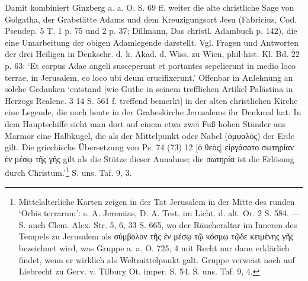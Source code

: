 \documentclass[a4paper, 11pt, oneside]{article}
\begin{document}
Damit kombiniert Ginzberg a. a. O. S. 69 ff. weiter die alte christliche Sage von Golgatha, der Grabstätte Adams und dem Kreuzigungsort Jesu (Fabricius, Cod. Pseudep. 5 T. 1 p. 75 und 2 p. 37; Dillmann, Das christl. Adambuch p. 142), die eine Umarbeitung der obigen Adamlegende darstellt. Vgl. Fragen und Antworten der drei Heiligen in Denkschr. d. k. Akad. d. Wiss. zu Wien, phil-hist. Kl. Bd. 22 p. 63: `Et corpus Adae angeli susceperunt et portantes sepelierunt in medio loco terrae, in Jerusalem, eo loco ubi deum crucifixerunt.' Offenbar in Anlehnung an solche Gedanken `entstand [wie Guthe in seinem trefflichen Artikel Palästina in Herzogs Realenc. 3 14 S. 561 f. treffend bemerkt] in der alten christlichen Kirche eine Legende, die noch heute in der Grabeskirche Jerusalems ihr Denkmal hat. In dem Hauptschiffe sieht man dort auf einem etwa zwei Fuß hohen Ständer aus Marmor eine Halbkugel, die als der Mittelpunkt oder Nabel (ὀμφαλός) der Erde gilt. Die griechische Übersetzung von Ps. 74 (73) 12 [ὁ θεὸς] εἰργάσατο σωτηρίαν ἐν μέσῳ τῆς γῆς gilt als die Stütze dieser Annahme; die σωτηρία ist die Erlösung durch Christum.'\footnote{Mittelalterliche Karten zeigen in der Tat Jerusalem in der Mitte des runden `Orbis terrarum': s. A. Jeremias, D. A. Test. im Licht. d. alt. Or. 2 S. 584. --- S. auch Clem. Alex. Str. 5, 6, 33 S. 665, wo der Räucheraltar im Inneren des Tempels zu Jerusalem als σύμβολον τῆς ἐν μέσῳ τῷ κόσμῳ τῷδε κειμένης γῆς bezeichnet wird, was Gruppe a. a. O. 725, 4 mit Recht nur dann erklärlich findet, wenn er wirklich als Weltmittelpunkt galt. Gruppe verweist noch auf Liebrecht zu Gerv. v. Tilbury Ot. imper. S. 54. S. uns. Taf. 9, 4.} S. uns. Taf. 9, 3.
\end{document}
